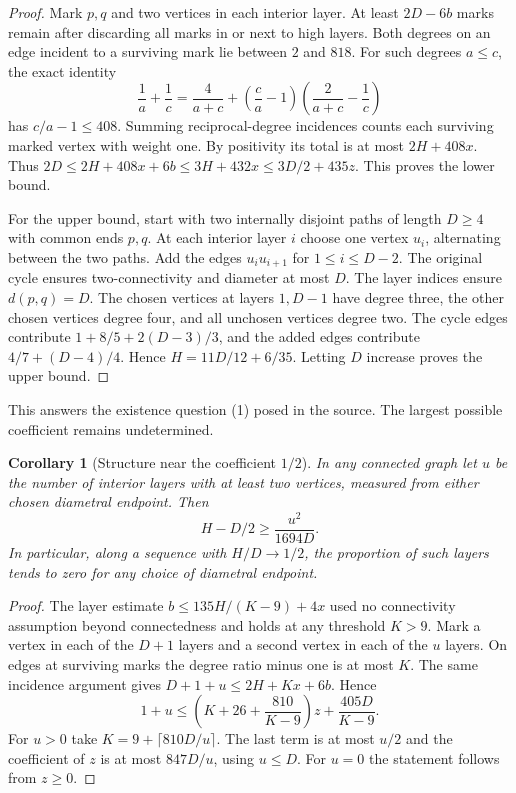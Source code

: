 \documentclass[11pt,a4paper]{article}
\newtheorem{corollary}[theorem]{Corollary}
\begin{document}
\begin{proof}
Mark $p,q$ and two vertices in each interior layer. At least $2D-6b$ marks remain after discarding all marks in or next to high layers. Both degrees on an edge incident to a surviving mark lie between $2$ and $818$. For such degrees $a\le c$, the exact identity
\[
 \frac1a+\frac1c=\frac4{a+c}
       +\left(\frac ca-1\right)\left(\frac2{a+c}-\frac1c\right)
\]
has $c/a-1\le408$. Summing reciprocal-degree incidences counts each surviving marked vertex with weight one. By positivity its total is at most $2H+408x$. Thus $2D\le2H+408x+6b\le3H+432x\le3D/2+435z$. This proves the lower bound.

For the upper bound, start with two internally disjoint paths of length $D\ge4$ with common ends $p,q$. At each interior layer $i$ choose one vertex $u_i$, alternating between the two paths. Add the edges $u_i u_{i+1}$ for $1\le i\le D-2$. The original cycle ensures two-connectivity and diameter at most $D$. The layer indices ensure $d(p,q)=D$. The chosen vertices at layers $1,D-1$ have degree three, the other chosen vertices degree four, and all unchosen vertices degree two. The cycle edges contribute $1+8/5+2(D-3)/3$, and the added edges contribute $4/7+(D-4)/4$. Hence $H=11D/12+6/35$. Letting $D$ increase proves the upper bound.
\end{proof}
This answers the existence question (1) posed in the source. The largest possible coefficient remains undetermined.

\begin{corollary}[Structure near the coefficient $1/2$]
In any connected graph let $u$ be the number of interior layers with at least two vertices, measured from either chosen diametral endpoint. Then
\[
 H-D/2\ge\frac{u^2}{1694D}.
\]
In particular, along a sequence with $H/D\to1/2$, the proportion of such layers tends to zero for any choice of diametral endpoint.
\end{corollary}
\begin{proof}
The layer estimate $b\le135H/(K-9)+4x$ used no connectivity assumption beyond connectedness and holds at any threshold $K>9$. Mark a vertex in each of the $D+1$ layers and a second vertex in each of the $u$ layers. On edges at surviving marks the degree ratio minus one is at most $K$. The same incidence argument gives $D+1+u\le2H+Kx+6b$. Hence
\[
 1+u\le\left(K+26+\frac{810}{K-9}\right)z+\frac{405D}{K-9}.
\]
For $u>0$ take $K=9+\lceil810D/u\rceil$. The last term is at most $u/2$ and the coefficient of $z$ is at most $847D/u$, using $u\le D$. For $u=0$ the statement follows from $z\ge0$.
\end{proof}
\end{document}
